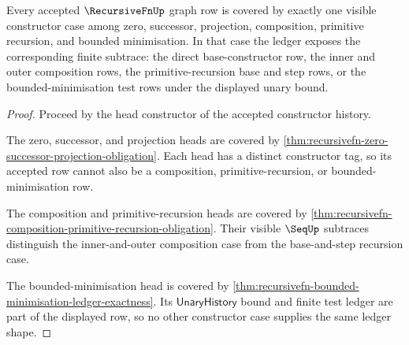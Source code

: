 \begin{theorem}
\label{thm:recursivefn-constructor-ledger-coverage-obligation}
Every accepted $\RecursiveFnUp$ graph row is covered by exactly one visible
constructor case among zero, successor, projection, composition, primitive
recursion, and bounded minimisation. In that case the ledger exposes the
corresponding finite subtrace: the direct base-constructor row, the inner and
outer composition rows, the primitive-recursion base and step rows, or the
bounded-minimisation test rows under the displayed unary bound.
\end{theorem}
\begin{proof}
Proceed by the head constructor of the accepted constructor history.

The zero, successor, and projection heads are covered by
\autoref{thm:recursivefn-zero-successor-projection-obligation}. Each head has
a distinct constructor tag, so its accepted row cannot also be a composition,
primitive-recursion, or bounded-minimisation row.

The composition and primitive-recursion heads are covered by
\autoref{thm:recursivefn-composition-primitive-recursion-obligation}. Their
visible $\SeqUp$ subtraces distinguish the inner-and-outer composition case
from the base-and-step recursion case.

The bounded-minimisation head is covered by
\autoref{thm:recursivefn-bounded-minimisation-ledger-exactness}. Its
$\mathsf{UnaryHistory}$ bound and finite test ledger are part of the displayed
row, so no other constructor case supplies the same ledger shape.
\end{proof}

